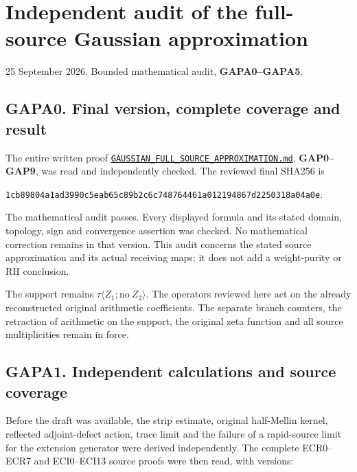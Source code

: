 \section{Independent audit of the full-source Gaussian
approximation}\label{independent-audit-of-the-full-source-gaussian-approximation}

25 September 2026. Bounded mathematical audit, \textbf{GAPA0--GAPA5}.

\subsection{GAPA0. Final version, complete coverage and
result}\label{gapa0.-final-version-complete-coverage-and-result}

The entire written proof
\href{https://github.com/KokunoYumeto/zeta-function-research-reader/blob/main/workbenches/splitzero-tandem/continuations/20260925-source-endpoint-and-section/GAUSSIAN_FULL_SOURCE_APPROXIMATION.md}{\nolinkurl{GAUSSIAN_FULL_SOURCE_APPROXIMATION.md}},
\textbf{GAP0--GAP9}, was read and independently checked. The reviewed
final SHA256 is

\nolinkurl{1cb89804a1ad3990c5eab65c89b2c6c748764461a012194867d2250318a04a0e}.

The mathematical audit passes. Every displayed formula and its stated
domain, topology, sign and convergence assertion was checked. No
mathematical correction remains in that version. This audit concerns the
stated source approximation and its actual receiving maps; it does not
add a weight-purity or RH conclusion.

The support remains \(\tau\langle Z_1;\mathrm{no}\ Z_2\rangle\). The
operators reviewed here act on the already reconstructed original
arithmetic coefficients. The separate branch counters, the retraction of
arithmetic on the support, the original zeta function and all source
multiplicities remain in force.

\subsection{GAPA1. Independent calculations and source
coverage}\label{gapa1.-independent-calculations-and-source-coverage}

Before the draft was available, the strip estimate, original half-Mellin
kernel, reflected adjoint-defect action, trace limit and the failure of
a rapid-source limit for the extension generator were derived
independently. The complete ECR0--ECR7 and ECI0--ECI13 source proofs
were then read, with versions:

